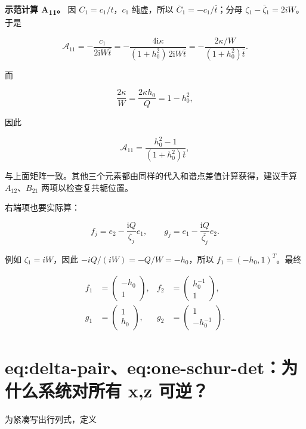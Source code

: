 \textbf{示范计算 A\textsubscript{1}\textsubscript{1}。} 因 $C_{1}=c_{1}/t$，$c_{1}$ 纯虚，所以 $\overline C_{1}=-c_{1}/\bar t$；分母 $\zeta{}_{1}-\bar\zeta{}_{1}=2iW$。于是\par

\[
\mathcal A_{11}
=-\dfrac{c_1}{2\mathrm{i}W\overline t}
=-\dfrac{4\mathrm{i}\kappa}{(1+h_0^2)\,2\mathrm{i}W\overline t}
=-\dfrac{2\kappa/W}{(1+h_0^2)\overline t}.
\]

而\par

\[
\dfrac{2\kappa}{W}
=\dfrac{2\kappa h_0}{Q}=1-h_0^2,
\]

因此\par

\[
\mathcal A_{11}
=\dfrac{h_0^2-1}{(1+h_0^2)\overline t},
\]

与上面矩阵一致。其他三个元素都由同样的代入和谱点差值计算获得，建议手算 $A_{12}$、$B_{21}$ 两项以检查复共轭位置。\par

右端项也要实际算：\par

\[
f_j=e_2-\dfrac{\mathrm{i}Q}{\zeta_j}e_1,\qquad
g_j=e_1-\dfrac{\mathrm{i}Q}{\overline{\zeta_j}}e_2.
\]

例如 $\zeta{}_{1}=iW$，因此 $-iQ/(iW)=-Q/W=-h_{0}$，所以 $f_{1}=(-h_{0},1)^{T}$。最终\par

\[
\begin{aligned}
f_1&=\begin{pmatrix}-h_0\\1\end{pmatrix},
& f_2&=\begin{pmatrix}h_0^{-1}\\1\end{pmatrix},\\
g_1&=\begin{pmatrix}1\\h_0\end{pmatrix},
& g_2&=\begin{pmatrix}1\\-h_0^{-1}\end{pmatrix}.
\end{aligned}
\]

\section{eq:delta-pair、eq:one-schur-det：为什么系统对所有 x,z 可逆？}

为紧凑写出行列式，定义\par

